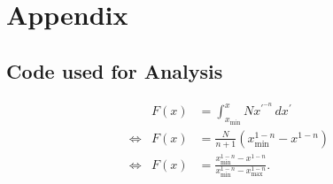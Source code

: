 \section{Appendix}
\label{sec:anhang}
\subsection{Code used for Analysis}


\begin{align}
     & F(x) &= \int_{x_\text{min}}^x N x^\prime^{-n} \, dx^\prime \\ 
\iff & F(x) &= \frac{N}{n+1} (x_\text{min}^{1-n} - x^{1-n}) \\
\iff & F(x) &= \frac{x_\text{min}^{1-n} - x^{1-n}}{ x_\text{min}^{1-n} - x_\text{max}^{1-n}} .
\end{align}